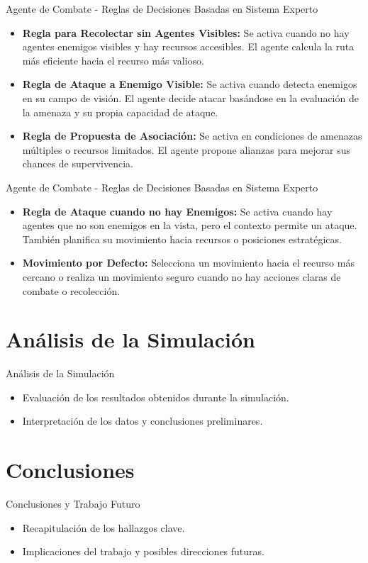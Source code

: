 \documentclass{beamer}
\begin{document}
\begin{frame}{Agente de Combate - Reglas de Decisiones Basadas en Sistema Experto}
  \begin{itemize}
    \item \textbf{Regla para Recolectar sin Agentes Visibles:} Se activa cuando no hay agentes enemigos visibles y hay recursos accesibles. El agente calcula la ruta más eficiente hacia el recurso más valioso.
    \item \textbf{Regla de Ataque a Enemigo Visible:} Se activa cuando detecta enemigos en su campo de visión. El agente decide atacar basándose en la evaluación de la amenaza y su propia capacidad de ataque.
    \item \textbf{Regla de Propuesta de Asociación:} Se activa en condiciones de amenazas múltiples o recursos limitados. El agente propone alianzas para mejorar sus chances de supervivencia.
  \end{itemize}
\end{frame}

\begin{frame}{Agente de Combate - Reglas de Decisiones Basadas en Sistema Experto}
  \begin{itemize}
    \item \textbf{Regla de Ataque cuando no hay Enemigos:} Se activa cuando hay agentes que no son enemigos en la vista, pero el contexto permite un ataque. También planifica su movimiento hacia recursos o posiciones estratégicas.
    \item \textbf{Movimiento por Defecto:} Selecciona un movimiento hacia el recurso más cercano o realiza un movimiento seguro cuando no hay acciones claras de combate o recolección.
  \end{itemize}
\end{frame}

\section{Análisis de la Simulación}
\begin{frame}{Análisis de la Simulación}
  \begin{itemize}
    \item Evaluación de los resultados obtenidos durante la simulación.
    \item Interpretación de los datos y conclusiones preliminares.
  \end{itemize}
\end{frame}

\section{Conclusiones}
\begin{frame}{Conclusiones y Trabajo Futuro}
  \begin{itemize}
    \item Recapitulación de los hallazgos clave.
    \item Implicaciones del trabajo y posibles direcciones futuras.
  \end{itemize}
\end{frame}
\end{document}
